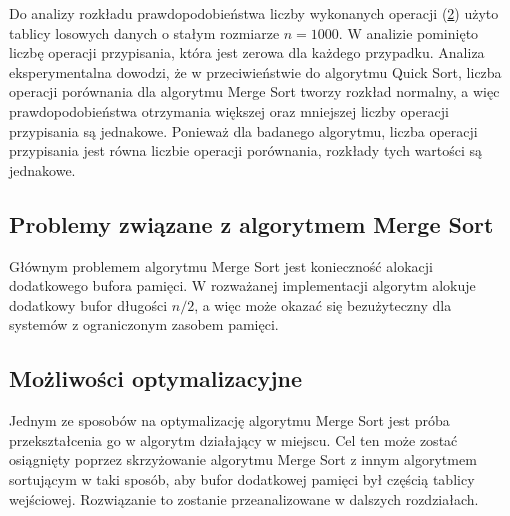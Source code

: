 Do analizy rozkładu prawdopodobieństwa liczby wykonanych operacji (\ref{fig:merge-sort-density}) użyto tablicy losowych danych o stałym rozmiarze $n = 1000$. W analizie pominięto liczbę operacji przypisania, która jest zerowa dla każdego przypadku. Analiza eksperymentalna dowodzi, że w przeciwieństwie do algorytmu Quick Sort, liczba operacji porównania dla algorytmu Merge Sort tworzy rozkład normalny, a więc prawdopodobieństwa otrzymania większej oraz mniejszej liczby operacji przypisania są jednakowe. Ponieważ dla badanego algorytmu, liczba operacji przypisania jest równa liczbie operacji porównania, rozkłady tych wartości są jednakowe.

\begin{figure}[]
	\centering
	
	\caption[]{}
	\label{fig:merge-sort-optimistic-average-pessimistic-case}
\end{figure}

\begin{figure}[]
	\centering
	
	\caption[]{}
	\label{fig:merge-sort-density}
\end{figure}

\subsection{Problemy związane z algorytmem Merge Sort}
Głównym problemem algorytmu Merge Sort jest konieczność alokacji dodatkowego bufora pamięci. W rozważanej implementacji algorytm alokuje dodatkowy bufor długości $n/2$, a więc może okazać się bezużyteczny dla systemów z ograniczonym zasobem pamięci.\\

\subsection{Możliwości optymalizacyjne}
Jednym ze sposobów na optymalizację algorytmu Merge Sort jest próba przekształcenia go w algorytm działający w miejscu.
Cel ten może zostać osiągnięty poprzez skrzyżowanie algorytmu Merge Sort z innym algorytmem sortującym w taki sposób, aby bufor dodatkowej pamięci był częścią tablicy wejściowej. Rozwiązanie to zostanie przeanalizowane w dalszych rozdziałach.\\
